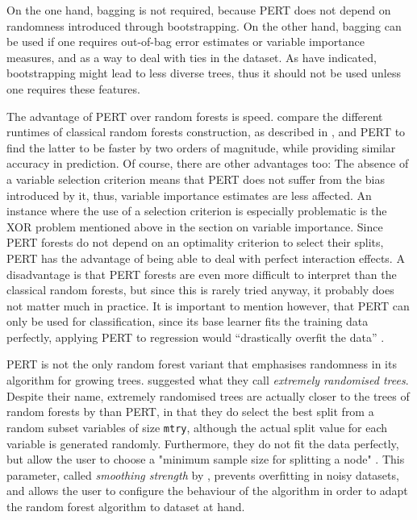 \documentclass[a4paper,man,12pt,apacite,floatsintext,draftfirst]{apa6} %
\begin{document}
On the one hand, bagging is not required, because PERT does not depend on
randomness introduced through bootstrapping.
On the other hand, bagging can be used if one requires out-of-bag
error estimates or variable importance measures, and as a way to deal
with ties in the dataset.
As  have indicated, bootstrapping might lead
to less diverse trees, thus it should not be used unless one requires
these features.

The advantage of PERT over random forests is speed.
 compare the different runtimes of classical random
forests construction, as described in , and PERT
to find the latter to be faster by two orders of magnitude,
while providing similar accuracy in prediction.
Of course, there are other advantages too:
The absence of a variable selection criterion means that PERT does not suffer
from the bias introduced by it, thus, variable importance estimates are less
affected.
An instance where the use of a selection criterion is especially problematic
is the XOR problem mentioned above in the section on variable importance.
Since PERT forests do not depend on an optimality criterion to select their
splits, PERT has the advantage of being able to deal with perfect
interaction effects.
A disadvantage is that PERT forests are even more difficult to interpret than
the classical random forests, but since this is rarely tried anyway,
it probably does not matter much in practice.
It is important to mention however, that PERT can only be used for
classification,
since its base learner fits the training data perfectly, applying PERT to
regression would “drastically overfit the data” \cite{cutler2001pert}.

PERT is not the only random forest variant that emphasises randomness in its
algorithm for growing trees.
 suggested what they call \emph{extremely randomised trees}.
Despite their name, extremely randomised trees are actually closer to the
trees of random forests by  than PERT, 
in that they do select the best split from a random subset variables of size \texttt{mtry},
although the actual split value for each variable is generated randomly.
Furthermore, they do not fit the data perfectly, but allow the user to
choose a "minimum sample size for splitting a node" \cite{geurts2006extremely}.
This parameter, called \emph{smoothing strength} by ,
prevents overfitting in noisy datasets, and allows the user to configure the
behaviour of the algorithm in order to adapt
the random forest algorithm to dataset at hand.
\end{document}
